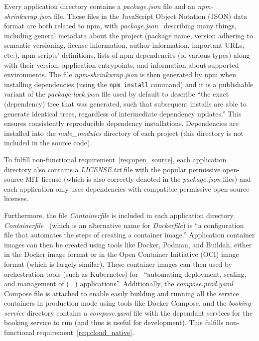 \begin{sloppypar}
Every application directory contains a \textit{package.json} file and an \textit{npm-shrinkwrap.json} file. These files in the JavaScript Object Notation (JSON) data format are both related to npm, with \textit{package.json}~\cite{npm_docs} describing many things, including general metadata about the project (package name, version adhering to semantic versioning, license information, author information, important URLs, etc.), npm scripts' definitions, lists of npm dependencies (of various types) along with their version, application entrypoints, and information about supported environments. The file \textit{npm-shrinkwrap.json} is then generated by npm when installing dependencies (using the \texttt{npm install} command) and it is a publishable variant of the \textit{package-lock.json} file used by default to describe \enquote{the exact (dependency) tree that was generated, such that subsequent installs are able to generate identical trees, regardless of intermediate dependency updates.} This ensures consistently reproducible dependency installations. Dependencies are installed into the \textit{node\_modules} directory of each project (this directory is not included in the source code).
\end{sloppypar}

To fulfill non-functional requirement~\ref{req:open_source}, each application directory also contains a \textit{LICENSE.txt} file with the popular permissive open-source MIT license (which is also correctly denoted in the \textit{package.json} files) and each application only uses dependencies with compatible permissive open-source licenses.

Furthermore, the file \textit{Containerfile} is included in each application directory. \textit{Containerfile}~\cite{podman_github} (which is an alternative name for \textit{Dockerfile}) is \enquote{a configuration file that automates the steps of creating a container image.} Application container images can then be created using tools like Docker, Podman, and Buildah, either in the Docker image format or in the Open Container Initiative (OCI) image format (which is largely similar). These container images can then used by orchestration tools (such as Kubernetes) for~\cite{kubernetes} \enquote{automating deployment, scaling, and management of (...) applications}. Additionally, the \textit{compose.prod.yaml} Compose file is attached to enable easily building and running all the service containers in production mode using tools like Docker Compose, and the \textit{booking-service} directory contains a \textit{compose.yaml} file with the dependant services for the booking service to run (and thus is useful for development). This fulfills non-functional requirement~\ref{req:cloud_native}.

